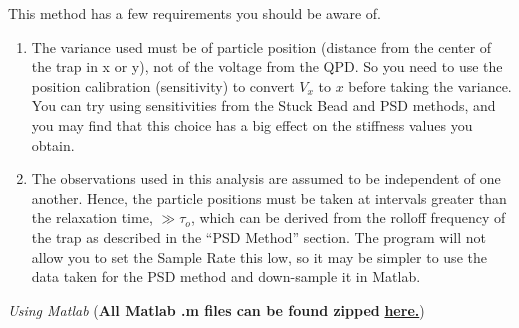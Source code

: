 \documentclass{../lab}
\begin{document}
This method has a few requirements you should be aware of.

\begin{enumerate}
    \item The variance used must be of particle position (distance from the center of the trap in x or y), not of the voltage from the QPD. So you need to use the position calibration (sensitivity) to convert $V_x$ to $x$ before taking the variance. You can try using sensitivities from the Stuck Bead and PSD methods, and you may find that this choice has a big effect on the stiffness values you obtain.

    \item The observations used in this analysis are assumed to be independent of one another. Hence, the particle positions must be taken at intervals greater than the relaxation time, $\gg \tau_o$, which can be derived from the rolloff frequency of the trap as described in the ``PSD Method'' section. The program will not allow you to set the Sample Rate this low, so it may be simpler to use the data taken for the PSD method and down-sample it in Matlab.

\end{enumerate}

\emph{Using Matlab } (\textbf{All Matlab .m files can be found zipped }\href{http://experimentationlab.berkeley.edu/sites/default/files/ZIP\_files/OTZ\_Matlab\_files.zip}{\textbf{here.}})
\end{document}
